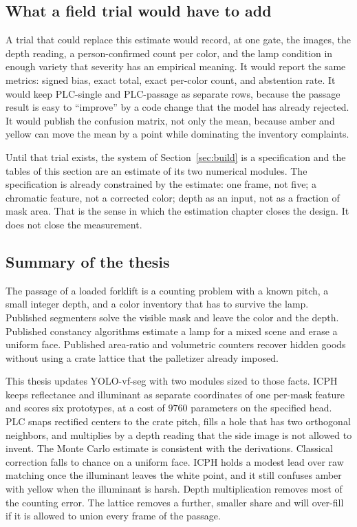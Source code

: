 \subsection{What a field trial would have to add}
\label{sec:field}

A trial that could replace this estimate would record, at one gate, the images, the depth reading, a person-confirmed count per color, and the lamp condition in enough variety that severity has an empirical meaning. It would report the same metrics: signed bias, exact total, exact per-color count, and abstention rate. It would keep PLC-single and PLC-passage as separate rows, because the passage result is easy to ``improve'' by a code change that the model has already rejected. It would publish the confusion matrix, not only the mean, because amber and yellow can move the mean by a point while dominating the inventory complaints.

Until that trial exists, the system of Section~\ref{sec:build} is a specification and the tables of this section are an estimate of its two numerical modules. The specification is already constrained by the estimate: one frame, not five; a chromatic feature, not a corrected color; depth as an input, not as a fraction of mask area. That is the sense in which the estimation chapter closes the design. It does not close the measurement.




\subsection{Summary of the thesis}
\label{sec:summary}

The passage of a loaded forklift is a counting problem with a known pitch, a small integer depth, and a color inventory that has to survive the lamp. Published segmenters solve the visible mask and leave the color and the depth. Published constancy algorithms estimate a lamp for a mixed scene and erase a uniform face. Published area-ratio and volumetric counters recover hidden goods without using a crate lattice that the palletizer already imposed.

This thesis updates YOLO-vf-seg with two modules sized to those facts. ICPH keeps reflectance and illuminant as separate coordinates of one per-mask feature and scores six prototypes, at a cost of $9760$ parameters on the specified head. PLC snaps rectified centers to the crate pitch, fills a hole that has two orthogonal neighbors, and multiplies by a depth reading that the side image is not allowed to invent. The Monte Carlo estimate is consistent with the derivations. Classical correction falls to chance on a uniform face. ICPH holds a modest lead over raw matching once the illuminant leaves the white point, and it still confuses amber with yellow when the illuminant is harsh. Depth multiplication removes most of the counting error. The lattice removes a further, smaller share and will over-fill if it is allowed to union every frame of the passage.

